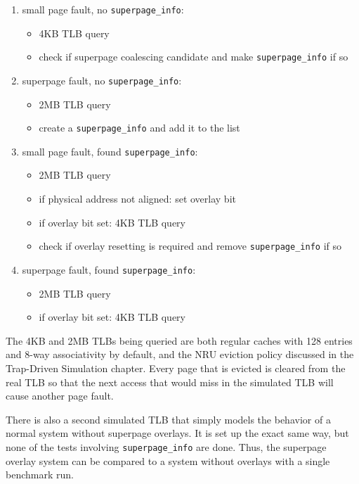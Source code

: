 \begin{enumerate}
\item small page fault, no \verb|superpage_info|:
\begin{itemize}
  \item 4KB TLB query
  \item check if superpage coalescing candidate and make \verb|superpage_info| if so
\end{itemize}

\item superpage fault, no \verb|superpage_info|:
\begin{itemize}
  \item 2MB TLB query
  \item create a \verb|superpage_info| and add it to the list
\end{itemize}

\item small page fault, found \verb|superpage_info|:
\begin{itemize}
  \item 2MB TLB query
  \item if physical address not aligned: set overlay bit
  \item if overlay bit set: 4KB TLB query
  \item check if overlay resetting is required and remove \verb|superpage_info| if so
\end{itemize}

\item superpage fault, found \verb|superpage_info|:
\begin{itemize}
  \item 2MB TLB query
  \item if overlay bit set: 4KB TLB query
\end{itemize}
\end{enumerate}

The 4KB and 2MB TLBs being queried are both regular caches with 128 entries and 8-way associativity by default, and the NRU eviction policy discussed in the Trap-Driven Simulation chapter. Every page that is evicted is cleared from the real TLB so that the next access that would miss in the simulated TLB will cause another page fault.

There is also a second simulated TLB that simply models the behavior of a normal system without superpage overlays. It is set up the exact same way, but none of the tests involving \verb|superpage_info| are done. Thus, the superpage overlay system can be compared to a system without overlays with a single benchmark run.

